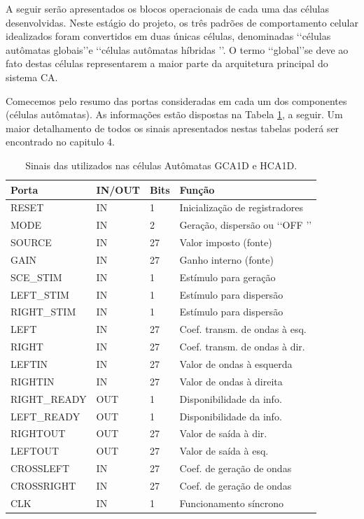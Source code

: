A seguir serão apresentados os blocos operacionais de cada uma das células desenvolvidas. Neste estágio do projeto, os três padrões de comportamento celular idealizados foram convertidos em duas únicas células, denominadas \lq\lq células autômatas globais\rq\rq e \lq\lq células autômatas híbridas \rq\rq. O termo \lq\lq global\rq\rq se deve ao fato destas células representarem a maior parte da arquitetura principal do sistema CA. 

Comecemos pelo resumo das portas consideradas em cada um dos componentes (células autômatas). As informações estão dispostas na Tabela \ref{tab:sinais}, a seguir. Um maior detalhamento de todos os sinais apresentados nestas tabelas poderá ser encontrado no capitulo 4.

\begin{table}
\centering
\caption{\label{tab:sinais} Sinais das utilizados nas células Autômatas GCA1D e HCA1D.}
\begin{tabular}{ |p{4cm}|p{1.5cm}|p{1.5cm}|p{5.5cm}|  }
 \hline
Porta & IN/OUT & Bits & Função \\
 \hline
RESET & IN & 1 & Inicialização de registradores \\
\hline
MODE  & IN & 2 & Geração, dispersão ou \lq\lq OFF \rq\rq \\
\hline
SOURCE  & IN & 27 & Valor imposto (fonte)  \\
\hline
GAIN  & IN & 27 & Ganho interno (fonte)  \\
\hline
SCE\_STIM  & IN & 1 & Estímulo para geração \\
\hline
LEFT\_STIM  & IN & 1 & Estímulo para dispersão \\ 
\hline
RIGHT\_STIM  & IN & 1 & Estímulo para dispersão \\
\hline
LEFT  & IN & 27 & Coef. transm. de ondas à esq. \\
\hline
RIGHT  & IN & 27 & Coef. transm. de ondas à dir. \\
\hline
LEFTIN  & IN & 27 & Valor de ondas à esquerda \\
\hline
RIGHTIN  & IN & 27 & Valor de ondas à direita \\
\hline
RIGHT\_READY  & OUT & 1 & Disponibilidade da info. \\
\hline
LEFT\_READY  & OUT & 1 & Disponibilidade da info. \\
\hline
RIGHTOUT  & OUT & 27 & Valor de saída à dir. \\
\hline
LEFTOUT  & OUT & 27 & Valor de saída à esq. \\
\hline
CROSSLEFT & IN & 27 & Coef. de geração de ondas \\
\hline
CROSSRIGHT & IN & 27 & Coef. de geração de ondas \\
\hline
CLK  & IN & 1 & Funcionamento síncrono \\
\hline
\end{tabular}
\end{table}

